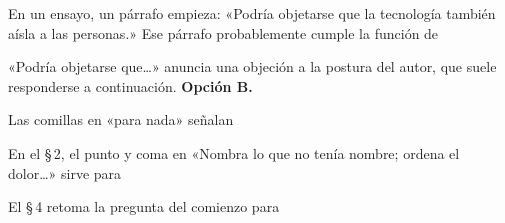 \begin{reto}
En un ensayo, un párrafo empieza: «Podría objetarse que la tecnología también aísla a las personas.» Ese párrafo
probablemente cumple la función de
\end{reto}

\begin{retoresuelto}
«Podría objetarse que…» anuncia una objeción a la postura del autor, que suele responderse a continuación.
\textbf{Opción B.}
\end{retoresuelto}

\taller
{}
\begin{ejercicios}
\item Las comillas en «para nada»  señalan
\item En el \S\,2, el punto y coma en «Nombra lo que no tenía nombre; ordena el dolor…» sirve para
\item El \S\,4 retoma la pregunta del comienzo para
\end{ejercicios}

\bitacora

